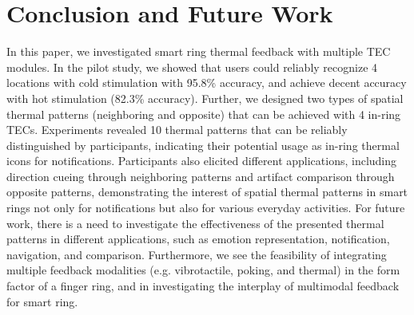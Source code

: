 \documentclass[preprint,12pt]{elsarticle}
\begin{document}
\section{Conclusion and Future Work}
In this paper, we investigated smart ring thermal feedback with multiple TEC modules. In the pilot study, we showed that users could reliably recognize 4 locations with cold stimulation with 95.8\% accuracy, and achieve decent accuracy with hot stimulation (82.3\% accuracy). Further, we designed two types of spatial thermal patterns (neighboring and opposite) that can be achieved with 4 in-ring TECs. Experiments revealed 10 thermal patterns that can be reliably distinguished by participants, indicating their potential usage as in-ring thermal icons for notifications. Participants also elicited different applications, including direction cueing through neighboring patterns and artifact comparison through opposite patterns, demonstrating the interest of spatial thermal patterns in smart rings not only for notifications but also for various everyday activities. For future work, there is a need to investigate the effectiveness of the presented thermal patterns in different applications, such as emotion representation, notification, navigation, and comparison. Furthermore, we see the feasibility of integrating multiple feedback modalities (e.g. vibrotactile, poking, and thermal) in the form factor of a finger ring, and in investigating the interplay of multimodal feedback for smart ring.
\end{document}
